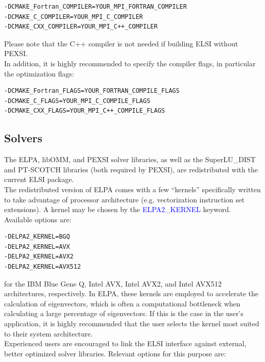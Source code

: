 \documentclass{report}
\begin{document}
\begin{verbatim}
-DCMAKE_Fortran_COMPILER=YOUR_MPI_FORTRAN_COMPILER
-DCMAKE_C_COMPILER=YOUR_MPI_C_COMPILER
-DCMAKE_CXX_COMPILER=YOUR_MPI_C++_COMPILER
\end{verbatim}

Please note that the C++ compiler is not needed if building ELSI without PEXSI.\\

In addition, it is highly recommended to specify the compiler flags, in particular the optimization flags:\\

\begin{verbatim}
-DCMAKE_Fortran_FLAGS=YOUR_FORTRAN_COMPILE_FLAGS
-DCMAKE_C_FLAGS=YOUR_MPI_C_COMPILE_FLAGS
-DCMAKE_CXX_FLAGS=YOUR_MPI_C++_COMPILE_FLAGS
\end{verbatim}

\subsection{Solvers}
\label{subsec:config_solvers}
The ELPA, libOMM, and PEXSI solver libraries, as well as the SuperLU\_DIST and PT-SCOTCH libraries (both required by PEXSI), are redistributed with the current ELSI package.\\

The redistributed version of ELPA comes with a few ``kernels'' specifically written to take advantage of processor architecture (e.g. vectorization instruction set extensions).  A kernel may be chosen by the \textcolor{blue}{ELPA2\_KERNEL} keyword.  Available options are:\\

\begin{verbatim}
-DELPA2_KERNEL=BGQ
-DELPA2_KERNEL=AVX
-DELPA2_KERNEL=AVX2
-DELPA2_KERNEL=AVX512
\end{verbatim}

for the IBM Blue Gene Q, Intel AVX, Intel AVX2, and Intel AVX512 architectures, respectively.  In ELPA, these kernels are employed to accelerate the calculation of eigenvectors, which is often a computational bottleneck when calculating a large percentage of eigenvectors.  If this is the case in the user's application, it is highly recommended that the user selects the kernel most suited to their system architecture.\\

Experienced users are encouraged to link the ELSI interface against external, better optimized solver libraries.  Relevant options for this purpose are:\\
\end{document}
